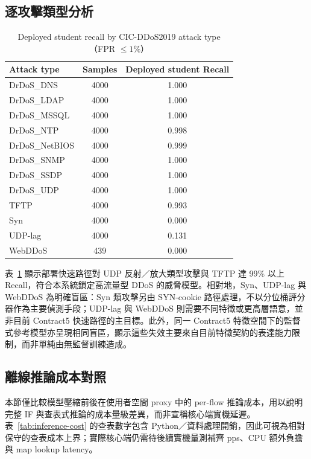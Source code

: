\documentclass[12pt, a4paper, fontset=none]{ctexart}
\begin{document}
\subsection{逐攻擊類型分析}
\begin{table}[H]
  \centering
  \caption{Deployed student recall by CIC-DDoS2019 attack type（FPR $\leq 1\%$）}
  \label{tab:per-attack}
  \renewcommand{\arraystretch}{1.2}
  \begin{tabular}{l c c}
    \toprule
    \textbf{Attack type} & \textbf{Samples} & \textbf{Deployed student Recall} \\
    \midrule
    DrDoS\_DNS & 4000 & 1.000 \\
    DrDoS\_LDAP & 4000 & 1.000 \\
    DrDoS\_MSSQL & 4000 & 1.000 \\
    DrDoS\_NTP & 4000 & 0.998 \\
    DrDoS\_NetBIOS & 4000 & 0.999 \\
    DrDoS\_SNMP & 4000 & 1.000 \\
    DrDoS\_SSDP & 4000 & 1.000 \\
    DrDoS\_UDP & 4000 & 1.000 \\
    TFTP & 4000 & 0.993 \\
    Syn & 4000 & 0.000 \\
    UDP-lag & 4000 & 0.131 \\
    WebDDoS & 439 & 0.000 \\
    \bottomrule
  \end{tabular}
\end{table}

表~\ref{tab:per-attack} 顯示部署快速路徑對 UDP 反射／放大類型攻擊與 TFTP 達 99\% 以上 Recall，符合本系統鎖定高流量型 DDoS 的威脅模型。相對地，Syn、UDP-lag 與 WebDDoS 為明確盲區：Syn 類攻擊另由 SYN-cookie 路徑處理，不以分位桶評分器作為主要偵測手段；UDP-lag 與 WebDDoS 則需要不同特徵或更高層語意，並非目前 Contract5 快速路徑的主目標。此外，同一 Contract5 特徵空間下的監督式參考模型亦呈現相同盲區，顯示這些失效主要來自目前特徵契約的表達能力限制，而非單純由無監督訓練造成。

\subsection{離線推論成本對照}
本節僅比較模型壓縮前後在使用者空間 proxy 中的 per-flow 推論成本，用以說明完整 IF 與查表式推論的成本量級差異，而非宣稱核心端實機延遲。表~\ref{tab:inference-cost} 的查表數字包含 Python／資料處理開銷，因此可視為相對保守的查表成本上界；實際核心端仍需待後續實機量測補齊 pps、CPU 額外負擔與 map lookup latency。
\end{document}
